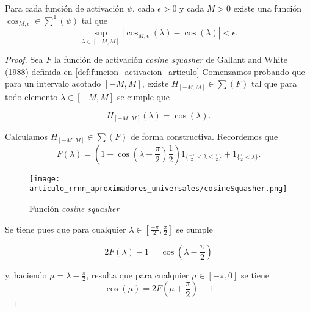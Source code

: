 \begin{lema}\label{lema:A_3_función_activación_continua_con_arbitaria}
    Para cada función de activación $\psi$, cada $\epsilon >0$
    y cada $M>0$ existe una función 
    $\cos_{M,\epsilon} \in \sum^1(\psi)$ tal que 
    \begin{equation}
        \sup_{ \lambda \in [-M, M]}
        |\cos_{M,\epsilon}(\lambda) - \cos(\lambda)|
        < 
        \epsilon. 
    \end{equation}
\end{lema}
\begin{proof}
    Sea $F$ la función de activación \textit{cosine squasher} de Gallant and White (1988) definida 
    en \ref{def:funcion_activacion_articulo} Comenzamos probando que para un intervalo acotado $[-M, M]$, existe $H_[-M, M] \in \sum(F)$ 
    tal que para todo elemento $\lambda \in [-M, M]$ se cumple que 

    \begin{equation}
        H_[-M, M](\lambda) = \cos(\lambda).
    \end{equation}

    Calculamos $H_[-M, M] \in \sum(F)$  de forma constructiva. Recordemos que  
    \begin{equation}
        F(\lambda )= \left(1 + \cos\left(\lambda -\frac{\pi}{2} \right) \frac{1}{2}\right) 
         1_{\{\frac{-\pi}{2} \leq \lambda \leq  \frac{\pi}{2}\}}
         +
         1_{\{ \frac{\pi}{2} < \lambda \}}.
    \end{equation}
    
    \begin{figure}[h]
        \centering
        \texttt{[image: articulo\_rrnn\_aproximadores\_universales/cosineSquasher.png]}
        \caption{Función \textit{cosine squasher}}
        \label{fig:cosine_squaser}
    \end{figure}

    Se tiene pues que para cualquier $\lambda \in \left[ \frac{-\pi}{2}, \frac{\pi}{2}\right]$ se cumple

    \begin{equation}
        2 F(\lambda)-1 = \cos \left( \lambda - \frac{\pi}{2}\right)
    \end{equation}

    y, haciendo $\mu = \lambda - \frac{\pi}{2}$, resulta que para cualquier
    $\mu \in [-\pi, 0]$ se tiene 
    \begin{equation}
        \cos(\mu) = 2 F \left(\mu + \frac{\pi}{2} \right)  -1 
    \end{equation}


\end{proof}
